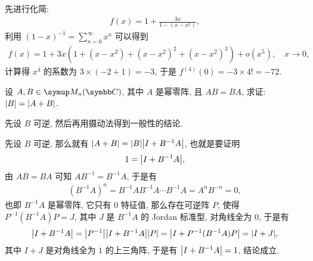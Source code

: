 \begin{exercise}[series=exer]
\begin{answer}
      先进行化简:
      \begin{align*}
          f(x) = 1 + \frac{3x}{1-(x - x^{2})},
      \end{align*}
      利用 $ (1 - x)^{-1} = \sum_{n = 0}^{\infty} x^{n} $ 可以得到
      \begin{align*}
          f(x) = 1 + 3x (1 + (x - x^{2}) + (x - x^{2})^{2} + (x - x^{2})^{3}) + o(x^{5}), \quad x \to 0,
      \end{align*}
      计算得 $ x^{4} $ 的系数为 $ 3 \times (-2 + 1) = -3 $, 于是 $ f^{(4)}(0) = -3 \times 4! = -72 $.
  \end{answer}
  \item 设 $ A, B \in \MM[\C] $, 其中 $ A $ 是幂零阵, 且 $ AB = BA $, 求证: $ \abs{B} = \abs{A + B} $.
  \begin{hint}
      先设 $ B $ 可逆, 然后再用摄动法得到一般性的结论.
  \end{hint}
  \begin{answer}
      先设 $ B $ 可逆, 那么就有 $ \abs{A + B} = \abs{B}\abs{I + B^{-1}A} $, 也就是要证明
      \begin{align*}
          1 = \abs{I + B^{-1}A},
      \end{align*}
      由 $ AB = BA $ 可知 $ AB^{-1} = B^{-1}A $, 于是有
      \begin{align*}
          (B^{-1}A)^{n} = B^{-1}AB^{-1}A\dotsm B^{-1}A = A^{n}B^{-n} = 0,
      \end{align*}
      也即 $ B^{-1}A $ 是幂零阵, 它只有 $ 0 $ 特征值, 那么存在可逆阵 $ P $, 使得 $ P^{-1}(B^{-1}A)P = J $, 其中 $ J $ 是 $ B^{-1}A $ 的 Jordan 标准型, 对角线全为 $ 0 $, 于是有
      \begin{align*}
          \abs{I + B^{-1}A} = \abs{P^{-1}}\abs{I + B^{-1}A}\abs{P} = \abs{I + P^{-1}(B^{-1}A)P} = \abs{I + J},
      \end{align*}
      其中 $ I + J $ 是对角线全为 $ 1 $ 的上三角阵, 于是有 $ \abs{I + B^{-1}A} = 1 $, 结论成立.


\end{answer}
\end{exercise}
